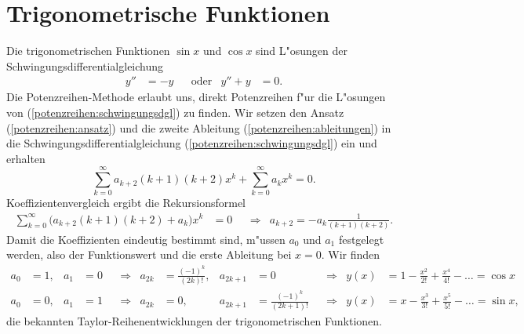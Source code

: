 \section{Trigonometrische Funktionen
\label{section:potenzreihen:trigo}}
Die trigonometrischen Funktionen $\sin x$ und $\cos x$ sind L"osungen
der Schwingungsdifferentialgleichung
\begin{equation}
\begin{aligned}
y''&=-y
&&\text{oder}&
y''+y&=0.
\end{aligned}
\label{potenzreihen:schwingungsdgl}
\end{equation}
Die Potenzreihen-Methode erlaubt uns, direkt Potenzreihen f"ur die
L"osungen von (\ref{potenzreihen:schwingungsdgl}) zu finden.
Wir setzen den Ansatz (\ref{potenzreihen:ansatz}) und die zweite Ableitung
(\ref{potenzreihen:ableitungen}) in die Schwingungsdifferentialgleichung
(\ref{potenzreihen:schwingungsdgl}) ein und erhalten
\begin{equation}
\sum_{k=0}^\infty a_{k+2}(k+1)(k+2)x^k 
+
\sum_{k=0}^\infty a_kx^k
=0.
\end{equation}
Koeffizientenvergleich ergibt die Rekursionsformel
\begin{equation}
\begin{aligned}
\sum_{k=0}^\infty \bigl(a_{k+2}(k+1)(k+2) + a_k\bigr)x^k
&=0
&&\Rightarrow&
a_{k+2}=-a_k\frac1{(k+1)(k+2)}.
\end{aligned}
\end{equation}
Damit die Koeffizienten eindeutig bestimmt sind, m"ussen $a_0$
und $a_1$ festgelegt werden, also der Funktionswert  und die erste
Ableitung bei $x=0$.
Wir finden
\begin{equation*}
\begin{aligned}
a_0&=1,&a_1&=0
&&\Rightarrow&
a_{2k}&=\frac{(-1)^k}{(2k)!},&a_{2k+1}&=0
&&\Rightarrow&
y(x)&=1-\frac{x^2}{2!}+\frac{x^4}{4!}-\dots=\cos x
\\
a_0&=0,&a_1&=1
&&\Rightarrow&
a_{2k}&=0,&a_{2k+1}&=\frac{(-1)^k}{(2k+1)!}
&&\Rightarrow&
y(x)&=x-\frac{x^3}{3!}+\frac{x^5}{5!}-\dots=\sin x,
\end{aligned}
\end{equation*}
die bekannten Taylor-Reihenentwicklungen der trigonometrischen Funktionen.

